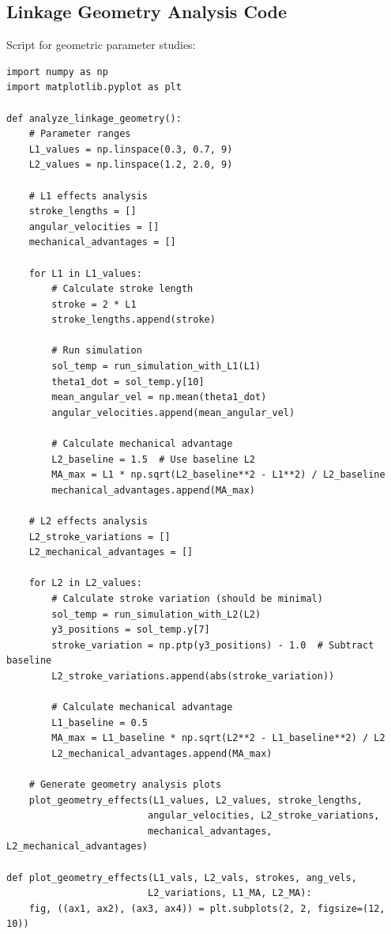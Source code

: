 \documentclass[10pt]{article}
\begin{document}
\subsection{Linkage Geometry Analysis Code}

Script for geometric parameter studies:

\begin{verbatim}
import numpy as np
import matplotlib.pyplot as plt

def analyze_linkage_geometry():
    # Parameter ranges
    L1_values = np.linspace(0.3, 0.7, 9)
    L2_values = np.linspace(1.2, 2.0, 9)
    
    # L1 effects analysis
    stroke_lengths = []
    angular_velocities = []
    mechanical_advantages = []
    
    for L1 in L1_values:
        # Calculate stroke length
        stroke = 2 * L1
        stroke_lengths.append(stroke)
        
        # Run simulation
        sol_temp = run_simulation_with_L1(L1)
        theta1_dot = sol_temp.y[10]
        mean_angular_vel = np.mean(theta1_dot)
        angular_velocities.append(mean_angular_vel)
        
        # Calculate mechanical advantage
        L2_baseline = 1.5  # Use baseline L2
        MA_max = L1 * np.sqrt(L2_baseline**2 - L1**2) / L2_baseline
        mechanical_advantages.append(MA_max)
    
    # L2 effects analysis
    L2_stroke_variations = []
    L2_mechanical_advantages = []
    
    for L2 in L2_values:
        # Calculate stroke variation (should be minimal)
        sol_temp = run_simulation_with_L2(L2)
        y3_positions = sol_temp.y[7]
        stroke_variation = np.ptp(y3_positions) - 1.0  # Subtract baseline
        L2_stroke_variations.append(abs(stroke_variation))
        
        # Calculate mechanical advantage
        L1_baseline = 0.5
        MA_max = L1_baseline * np.sqrt(L2**2 - L1_baseline**2) / L2
        L2_mechanical_advantages.append(MA_max)
    
    # Generate geometry analysis plots
    plot_geometry_effects(L1_values, L2_values, stroke_lengths, 
                         angular_velocities, L2_stroke_variations, 
                         mechanical_advantages, L2_mechanical_advantages)

def plot_geometry_effects(L1_vals, L2_vals, strokes, ang_vels, 
                         L2_variations, L1_MA, L2_MA):
    fig, ((ax1, ax2), (ax3, ax4)) = plt.subplots(2, 2, figsize=(12, 10))
    

\end{verbatim}
\end{document}
